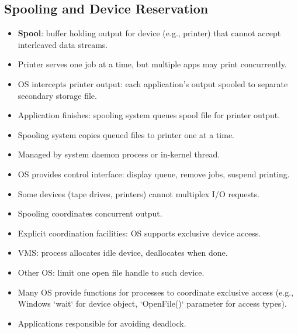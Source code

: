 \subsection{Spooling and Device Reservation}
\begin{itemize}
    \item \textbf{Spool}: buffer holding output for device (e.g., printer) that cannot accept interleaved data streams.
    \item Printer serves one job at a time, but multiple apps may print concurrently.
    \item OS intercepts printer output: each application's output spooled to separate secondary storage file.
    \item Application finishes: spooling system queues spool file for printer output.
    \item Spooling system copies queued files to printer one at a time.
    \item Managed by system daemon process or in-kernel thread.
    \item OS provides control interface: display queue, remove jobs, suspend printing.
    \item Some devices (tape drives, printers) cannot multiplex I/O requests.
    \item Spooling coordinates concurrent output.
    \item Explicit coordination facilities: OS supports exclusive device access.
    \item VMS: process allocates idle device, deallocates when done.
    \item Other OS: limit one open file handle to such device.
    \item Many OS provide functions for processes to coordinate exclusive access (e.g., Windows `wait` for device object, `OpenFile()` parameter for access types).
    \item Applications responsible for avoiding deadlock.
\end{itemize}

